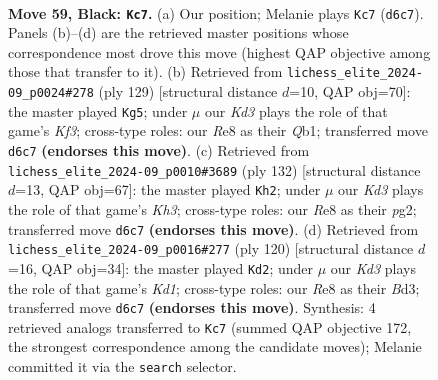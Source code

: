 \documentclass[11pt]{article}
\begin{document}
\clearpage

\begin{figure}[p]\centering
\begin{subfigure}{0.46\textwidth}\centering
\resizebox{\linewidth}{!}{%
\newchessgame
\chessboard[
  setfen={4r3/8/3k4/6P1/3QP2P/8/1K6/8 b - - 4 59},
  showmover=false,
  pgfstyle=straightmove, color=movearrow, markmove={d6-c7}
]}
\caption{}
\end{subfigure}\hfill
\begin{subfigure}{0.46\textwidth}\centering
\resizebox{\linewidth}{!}{%
\newchessgame
\chessboard[
  setfen={8/8/5k2/8/3Q2P1/7P/3K4/1q6 b - - 4 65},
  showmover=false,
  pgfstyle=straightmove, color=movearrow, markmove={f6-g5}
]}
\caption{}
\end{subfigure}
\\[4pt]
\begin{subfigure}{0.46\textwidth}\centering
\resizebox{\linewidth}{!}{%
\newchessgame
\chessboard[
  setfen={8/6k1/8/7p/8/5q1K/6p1/8 w - - 0 67},
  showmover=false,
  pgfstyle=straightmove, color=movearrow, markmove={h3-h2}
]}
\caption{}
\end{subfigure}\hfill
\begin{subfigure}{0.46\textwidth}\centering
\resizebox{\linewidth}{!}{%
\newchessgame
\chessboard[
  setfen={8/6k1/p7/1p1p4/6p1/3B4/8/3K3q w - - 0 61},
  showmover=false,
  pgfstyle=straightmove, color=movearrow, markmove={d1-d2}
]}
\caption{}
\end{subfigure}
\caption{\textbf{Move 59, Black: \texttt{Kc7}.} (a) Our position; Melanie plays \texttt{Kc7} (\texttt{d6c7}). Panels (b)--(d) are the retrieved master positions whose correspondence most drove this move (highest QAP objective among those that transfer to it). (b) Retrieved from \texttt{lichess\_elite\_2024-09\_p0024\#278} (ply 129) [structural distance $d$=10, QAP obj=70]: the master played \texttt{Kg5}; under $\mu$ our \emph{Kd3} plays the role of that game's \emph{Kf3}; cross-type roles: our \emph{R}e8 as their \emph{Q}b1; transferred move \texttt{d6c7} \textbf{(endorses this move)}. (c) Retrieved from \texttt{lichess\_elite\_2024-09\_p0010\#3689} (ply 132) [structural distance $d$=13, QAP obj=67]: the master played \texttt{Kh2}; under $\mu$ our \emph{Kd3} plays the role of that game's \emph{Kh3}; cross-type roles: our \emph{R}e8 as their \emph{p}g2; transferred move \texttt{d6c7} \textbf{(endorses this move)}. (d) Retrieved from \texttt{lichess\_elite\_2024-09\_p0016\#277} (ply 120) [structural distance $d$=16, QAP obj=34]: the master played \texttt{Kd2}; under $\mu$ our \emph{Kd3} plays the role of that game's \emph{Kd1}; cross-type roles: our \emph{R}e8 as their \emph{B}d3; transferred move \texttt{d6c7} \textbf{(endorses this move)}. Synthesis: 4 retrieved analogs transferred to \texttt{Kc7} (summed QAP objective 172, the strongest correspondence among the candidate moves); Melanie committed it via the \texttt{search} selector.}
\label{fig:thought-m117}
\end{figure}
\end{document}
